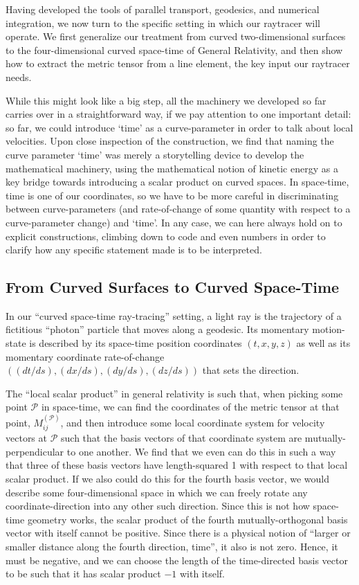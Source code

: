 \documentclass[twocolumn]{article}
\begin{document}
Having developed the tools of parallel transport, geodesics, and
numerical integration, we now turn to the specific setting in which
our raytracer will operate. We first generalize our treatment from
curved two-dimensional surfaces to the four-dimensional curved
space-time of General Relativity, and then show how to extract the
metric tensor from a line element, the key input our raytracer needs.

While this might look like a big step, all the machinery we developed
so far carries over in a straightforward way, if we pay attention to
one important detail: so far, we could introduce `time' as a
curve-parameter in order to talk about local velocities. Upon close
inspection of the construction, we find that naming the curve
parameter `time' was merely a storytelling device to develop the
mathematical machinery, using the mathematical notion of kinetic
energy as a key bridge towards introducing a scalar product on curved
spaces. In space-time, time is one of our coordinates, so we have to
be more careful in discriminating between curve-parameters (and
rate-of-change of some quantity with respect to a curve-parameter
change) and `time'. In any case, we can here always hold on to
explicit constructions, climbing down to code and even numbers in
order to clarify how any specific statement made is to be interpreted.

\subsection{From Curved Surfaces to Curved Space-Time}

In our ``curved space-time ray-tracing'' setting, a light ray is the
trajectory of a fictitious ``photon'' particle that moves along a
geodesic. Its momentary motion-state is described by its space-time
position coordinates \((t,x,y,z)\) as well as its momentary coordinate
rate-of-change \(((dt/ds),(dx/ds),(dy/ds),(dz/ds))\) that sets the
direction.

The ``local scalar product'' in general relativity is such that, when
picking some point ${\mathcal P}$ in space-time, we can find the
coordinates of the metric tensor at that point, $M^{({{\mathcal P}})}_{ij}$,
and then introduce some local coordinate system for
velocity vectors at ${\mathcal P}$ such that the basis vectors of that
coordinate system are mutually-perpendicular to one another. We find
that we even can do this in such a way that three of these basis
vectors have length-squared 1 with respect to that local scalar
product. If we also could do this for the fourth basis vector, we
would describe some four-dimensional space in which we can freely
rotate any coordinate-direction into any other such direction. Since
this is not how space-time geometry works, the scalar product of the
fourth mutually-orthogonal basis vector with itself cannot be
positive. Since there is a physical notion of ``larger or smaller
distance along the fourth direction, time'', it also is not
zero. Hence, it must be negative, and we can choose the length of the
time-directed basis vector to be such that it has scalar product $-1$
with itself.
\end{document}
